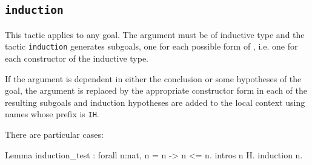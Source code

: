 \begin{coq_example*}
\begin{Variants}

\end{Variants}

\subsection{\tt induction \term}
\label{Tac-induction}

This tactic applies to any goal. The argument {\term} must be of
inductive type and the tactic {\tt induction} generates subgoals,
one for each possible form of {\term}, i.e. one for each constructor
of the inductive type.

If the argument is dependent in either the conclusion or some
hypotheses of the goal, the argument is replaced by the appropriate
constructor form in each of the resulting subgoals and induction
hypotheses are added to the local context using names whose prefix is
{\tt IH}.

There are particular cases:


\Example

\begin{coq_example}
Lemma induction_test : forall n:nat, n = n -> n <= n.
intros n H.
induction n.
\end{coq_example}


\end{coq_example*}
